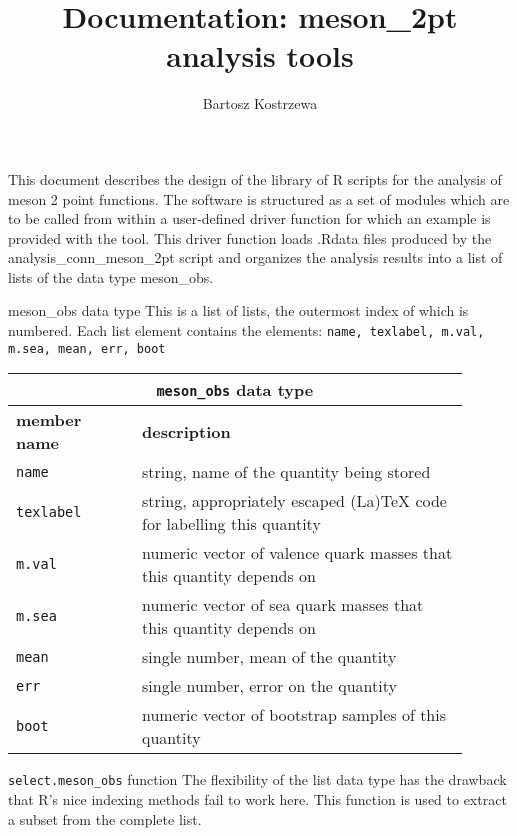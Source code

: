\documentclass[10pt,a4paper]{article}
\author{Bartosz Kostrzewa}
\title{Documentation: meson\_2pt analysis tools}
\begin{document}
This document describes the design of the library of R scripts for the analysis of meson 2 point functions.
The software is structured as a set of modules which are to be called from within a user-defined driver function for which an example is provided with the tool.
This driver function loads .Rdata files produced by the {\ttfamily analysis\_conn\_meson\_2pt} script and organizes the analysis results into a list of lists of the data type {\ttfamily meson\_obs}.

\begin{section}{{\ttfamily meson\_obs} data type}
This is a list of lists, the outermost index of which is numbered.
Each list element contains the elements: {\tt name, texlabel, m.val, m.sea, mean, err, boot}

\begin{table}[h]
\begin{tabular}{|p{0.25\linewidth}|p{0.65\linewidth}|}
\hline
\multicolumn{2}{|c|}{ {\tt meson\_obs} data type } \\
\hline \hline \textbf{member name} & \textbf{description} \\ \hline
{\tt name} & string, name of the quantity being stored \\ 
{\tt texlabel}  & string, appropriately escaped (La)TeX code for labelling this quantity  \\ 
{\tt m.val} & numeric vector of valence quark masses that this quantity depends on \\
{\tt m.sea} & numeric vector of sea quark masses that this quantity depends on \\
{\tt mean} & single number, mean of the quantity \\
{\tt err} & single number, error on the quantity \\
{\tt boot} & numeric vector of bootstrap samples of this quantity \\
\hline 
\end{tabular}
\end{table}

\begin{subsection}{{\tt select.meson\_obs} function}
The flexibility of the list data type has the drawback that R's nice indexing methods fail to work here.
This function is used to extract a subset from the complete list.


\end{subsection}
\end{section}
\end{document}
